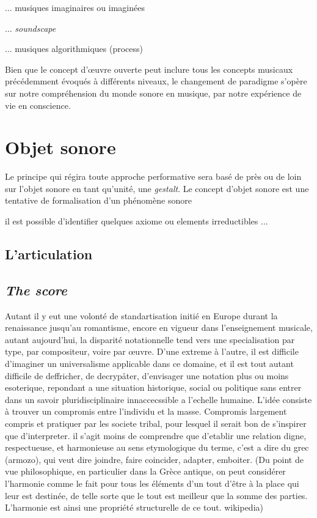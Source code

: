 \documentclass{article}
\begin{document}
  ... musiques imaginaires ou imaginées
  
  ... \textit{soundscape}
  
  ... musiques algorithmiques (process)

\bigskip

Bien que le concept d'œuvre ouverte peut inclure tous les concepts musicaux précédemment évoqués à différents niveaux, le changement de paradigme s'opère sur notre compréhension du monde sonore en musique, par notre expérience de vie en conscience.

\section{Objet sonore}

Le principe qui régira toute approche performative sera basé de près ou de loin sur l'objet sonore en tant qu'unité, une \textit{gestalt}. Le concept d'objet sonore est une tentative de formalisation d'un phénomène sonore 


\bigskip

il est possible d'identifier quelques axiome ou elements irreductibles ...


\subsection{L'articulation}


\subsection{\textsl{The score}}

Autant il y eut une volonté de standartisation initié en Europe durant la renaissance jusqu'au romantisme, encore en vigueur dans l'enseignement musicale, autant aujourd'hui, la disparité notationnelle tend vers une  specialisation par type, par compositeur, voire par œuvre.
D'une extreme à l'autre, il est difficile d'imaginer un universalisme applicable dans ce domaine, et il est tout autant difficile de deffricher, de decrypåter, d'envisager une notation plus ou moins esoterique, repondant a une situation historique, social ou politique sans entrer dans un savoir pluridisciplinaire innaccecssible a l'echelle humaine. L'idée consiste à trouver un compromis entre l'individu et la masse. Compromis largement compris et pratiquer par les societe tribal, pour lesquel il serait bon de s'inspirer que d'interpreter. il s'agit moins de comprendre que d'etablir une relation digne, respectueuse, et harmonieuse au sens etymologique du terme, c'est a dire du grec (armozo), qui veut dire joindre, faire coincider, adapter, emboiter. (Du point de vue philosophique, en particulier dans la Grèce antique, on peut considérer l'harmonie comme le fait pour tous les éléments d'un tout d'être à la place qui leur est destinée, de telle sorte que le tout est meilleur que la somme des parties. L'harmonie est ainsi une propriété structurelle de ce tout. wikipedia)
\end{document}
